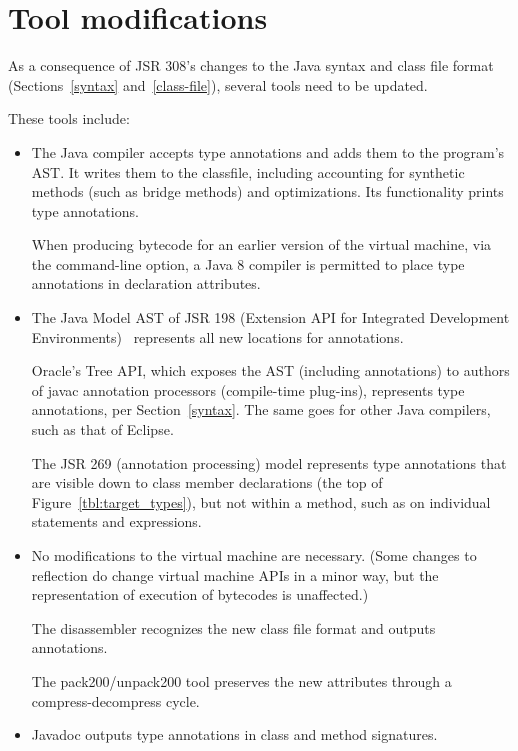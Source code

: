 \documentclass[10pt]{article}
\begin{document}
\section{Tool modifications\label{mods-discussion}}

As a consequence of JSR 308's changes to the Java syntax and class file
format (Sections~\ref{syntax} and~\ref{class-file}), several tools need to
be updated.

These tools include:
\begin{itemize}
\item
  The Java compiler accepts type annotations and adds them to the program's
  AST\@.  It writes them to the classfile, including accounting for
  synthetic methods (such as bridge methods) and optimizations.  Its
   functionality prints type annotations.

  When producing bytecode for an earlier version of the
  virtual machine, via the  command-line option, a Java 8
  compiler is permitted to place type
  annotations in declaration attributes.

\item
  The Java Model AST of JSR 198 (Extension API for Integrated Development
  Environments)~\cite{JSR198} represents all new locations for annotations.

  Oracle's Tree API, which exposes the AST (including annotations) to
  authors of javac annotation processors (compile-time plug-ins),
  represents type annotations, per Section~\ref{syntax}.  The same goes for
  other Java compilers, such as that of Eclipse.

  The JSR 269 (annotation processing) model
  represents type annotations that are visible down to class member
  declarations (the top of Figure~\ref{tbl:target_types}), but not within a
  method, such as on individual statements and expressions.

\item
  No modifications to the virtual machine are necessary.
  (Some changes to reflection do change virtual machine APIs in a minor
  way, but the representation of execution of bytecodes is unaffected.)
  
  The  disassembler recognizes the new class
  file format and outputs annotations.
  
  The pack200/unpack200 tool preserves the new attributes through a
  compress-decompress cycle.

\item
  Javadoc  outputs type annotations in class and method signatures.

\end{itemize}
\end{document}
